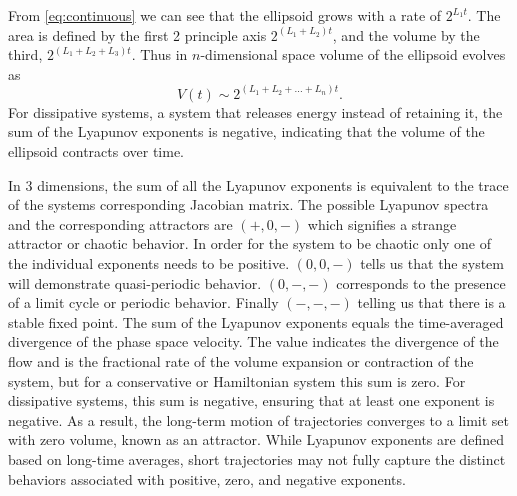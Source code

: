 From \eqref{eq:continuous} we can see that the ellipsoid grows with a rate of $2^{L_1t}$. The area is defined by the first 2 principle axis $2^{(L_1+L_2)t}$, and the volume by the third, $2^{(L_1+L_2+L_3)t}$. Thus in $n$-dimensional space volume of the ellipsoid evolves as
$$
V(t) \sim 2^{(L_1 + L_2 + \dots + L_n)t}.
$$
For dissipative systems, a system that releases energy instead of retaining it, the sum of the Lyapunov exponents is negative, indicating that the volume of the ellipsoid contracts over time.

In 3 dimensions, the sum of all the Lyapunov exponents is equivalent to the trace of the systems corresponding Jacobian matrix. 
The possible Lyapunov spectra and the corresponding attractors are $(+,0,-)$ which signifies a strange attractor or chaotic behavior. 
In order for the system to be chaotic only one of the individual exponents needs to be positive. 
$(0,0,-)$ tells us that the system will demonstrate quasi-periodic behavior. 
$(0,-,-)$ corresponds to the presence of a limit cycle or periodic behavior. 
Finally $(-,-,-)$ telling us that there is a stable fixed point. 
The sum of the Lyapunov exponents equals the time-averaged divergence of the phase space velocity. 
The value indicates the divergence of the flow and is the fractional rate of the volume expansion or contraction of the system, but for a conservative or Hamiltonian system this sum is zero. 
For dissipative systems, this sum is negative, ensuring that at least one exponent is negative. 
As a result, the long-term motion of trajectories converges to a limit set with zero volume, known as an attractor. 
While Lyapunov exponents are defined based on long-time averages, short trajectories may not fully capture the distinct behaviors associated with positive, zero, and negative exponents.



